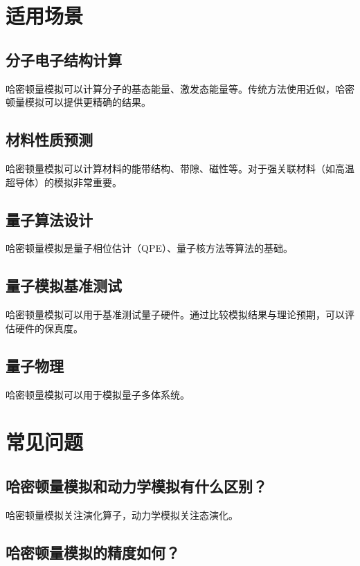 \documentclass[12pt,a4paper]{article}
\begin{document}
\section{适用场景}

\subsection{分子电子结构计算}

哈密顿量模拟可以计算分子的基态能量、激发态能量等。传统方法使用近似，哈密顿量模拟可以提供更精确的结果。

\subsection{材料性质预测}

哈密顿量模拟可以计算材料的能带结构、带隙、磁性等。对于强关联材料（如高温超导体）的模拟非常重要。

\subsection{量子算法设计}

哈密顿量模拟是量子相位估计（QPE）、量子核方法等算法的基础。

\subsection{量子模拟基准测试}

哈密顿量模拟可以用于基准测试量子硬件。通过比较模拟结果与理论预期，可以评估硬件的保真度。

\subsection{量子物理}

哈密顿量模拟可以用于模拟量子多体系统。

\section{常见问题}

\subsection{哈密顿量模拟和动力学模拟有什么区别？}

哈密顿量模拟关注演化算子，动力学模拟关注态演化。

\subsection{哈密顿量模拟的精度如何？}
\end{document}
